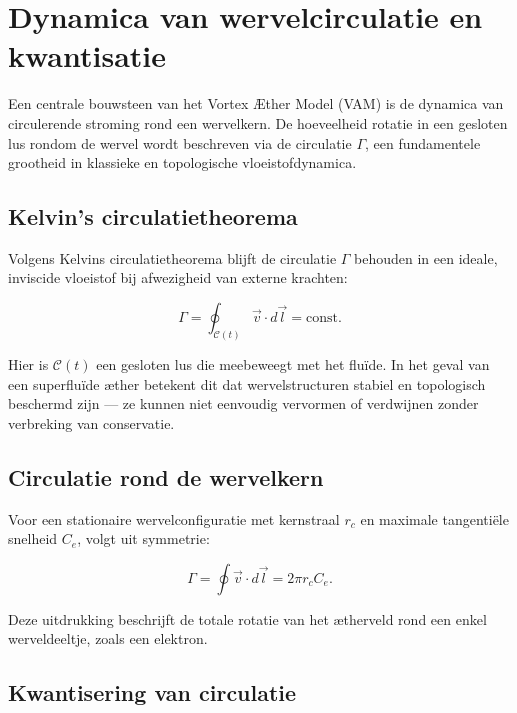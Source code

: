 
\section{Dynamica van wervelcirculatie en kwantisatie}\label{sec:appendix_4}

Een centrale bouwsteen van het Vortex Æther Model (VAM) is de dynamica van circulerende stroming rond een wervelkern. De hoeveelheid rotatie in een gesloten lus rondom de wervel wordt beschreven via de circulatie \( \Gamma \), een fundamentele grootheid in klassieke en topologische vloeistofdynamica.

\subsection{Kelvin's circulatietheorema}

Volgens Kelvin\rqs s circulatietheorema blijft de circulatie \( \Gamma \) behouden in een ideale, inviscide vloeistof bij afwezigheid van externe krachten:

\begin{equation}
\Gamma = \oint_{\mathcal{C}(t)} \vec{v} \cdot d\vec{l} = \text{const.}
\end{equation}

Hier is \( \mathcal{C}(t) \) een gesloten lus die meebeweegt met het fluïde. In het geval van een superfluïde æther betekent dit dat wervelstructuren stabiel en topologisch beschermd zijn — ze kunnen niet eenvoudig vervormen of verdwijnen zonder verbreking van conservatie.

\subsection{Circulatie rond de wervelkern}

Voor een stationaire wervelconfiguratie met kernstraal \( r_c \) en maximale tangentiële snelheid \( C_e \), volgt uit symmetrie:

\begin{equation}
\Gamma = \oint \vec{v} \cdot d\vec{l} = 2\pi r_c C_e.
\end{equation}

Deze uitdrukking beschrijft de totale rotatie van het ætherveld rond een enkel werveldeeltje, zoals een elektron.

\subsection{Kwantisering van circulatie}

